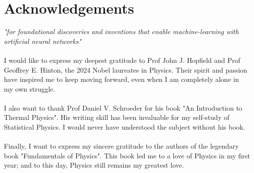 \documentclass[~/PhyAI/phyai.tex]{subfiles}
\begin{document}
\chapter*{Acknowledgements}
\textit{"for foundational discoveries and inventions that enable machine-learning with artificial neural networks"}
\\ \\ I would like to express my deepest gratitude to Prof John J. Hopfield and Prof Geoffrey E. Hinton, the 2024 Nobel laureates in Physics. Their spirit and passion have inspired me to keep moving forward, even when I am completely alone in my own struggle.
\\ \\
I also want to thank Prof Daniel V. Schroeder for his book "An Introduction to Thermal Physics". His writing skill has been invaluable for my self-study of Statistical Physics. I would never have understood the subject without his book.
\\ \\
Finally, I want to express my sincere gratitude to the authors of the legendary book "Fundamentals of Physics". This book led me to a love of Physics in my first year; and to this day, Physics still remains my greatest love.
\end{document}
